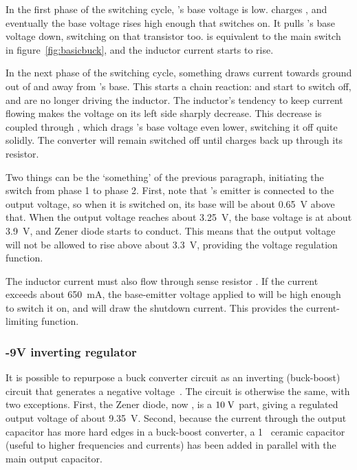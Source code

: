 In the first phase of the switching cycle, 's base voltage is
low.  charges , and eventually the base voltage rises
high enough that  switches on. It pulls 's base voltage
down, switching on that transistor too.  is equivalent to the main
switch in figure~\ref{fig:basicbuck}, and the inductor current starts to rise.

In the next phase of the switching cycle, something draws current towards ground
out of  and away from 's base. This starts a chain reaction:
 and  start to switch off, and are no longer driving the
inductor. The inductor's tendency to keep current flowing makes the voltage on its
left side sharply decrease. This decrease is coupled through , which
drags 's base voltage even lower, switching it off quite solidly.
The converter will remain switched off until  charges back up through
its resistor.

Two things can be the `something' of the previous paragraph, initiating the
switch from phase 1 to phase 2. First, note that 's emitter is
connected to the output voltage, so when it is switched on, its base will be
about 0.65~V above that. When the output voltage reaches about
3.25~V, the base voltage is at about 3.9~V, and Zener diode
 starts to conduct. This means that the output voltage will not be
allowed to rise above about 3.3~V, providing the voltage regulation
function.

The inductor current must also flow through sense resistor . If the
current exceeds about 650~mA, the base-emitter voltage applied to
 will be high enough to switch it on, and  will draw the
shutdown current. This provides the current-limiting function.

\subsubsection{-9V inverting regulator}
It is possible to repurpose a buck converter circuit as an inverting
(buck-boost) circuit that generates a negative voltage~\cite{buckinv}. The
circuit is otherwise the same, with two exceptions. First, the Zener diode, now
, is a $10\;\mathrm{V}$ part, giving a regulated output voltage of
about 9.35~V. Second, because the current through the output capacitor
has more hard edges in a buck-boost converter, a 1~\uF{} ceramic
capacitor (useful to higher frequencies and currents) has been added in
parallel with the main output capacitor.

